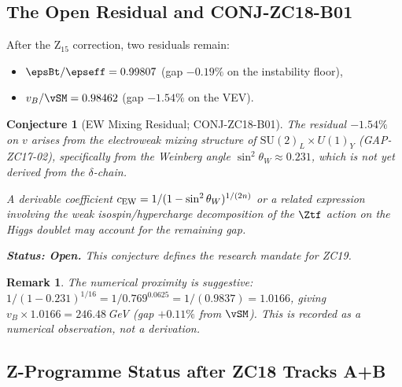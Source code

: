 \documentclass[12pt, a4paper]{article}
\newtheorem{remark}{Remark}[section]
\newtheorem{conjecture}{Conjecture}[section]
\begin{document}
\subsection{The Open Residual and CONJ-ZC18-B01}
\label{zc18b:sec:residual}

After the Z$_{15}$ correction, two residuals remain:
\begin{itemize}[leftmargin=*, noitemsep]
  \item $\epsBt/\epseff = 0.99807$ (gap $-0.19\%$ on the instability floor),
  \item $v_B/\vSM = 0.98462$ (gap $-1.54\%$ on the VEV).
\end{itemize}

\begin{conjecture}[EW Mixing Residual; CONJ-ZC18-B01]
\label{zc18b:conj:ew}
The residual $-1.54\%$ on $v$ arises from the electroweak mixing
structure of $\mathrm{SU}(2)_L\times U(1)_Y$ (GAP-ZC17-02),
specifically from the Weinberg angle $\sin^2\theta_W\approx 0.231$,
which is not yet derived from the $\delta$-chain.

A derivable coefficient
$c_{\rm EW} = 1/(1-\sin^2\theta_W)^{1/(2n)}$ or a related expression
involving the weak isospin/hypercharge decomposition of the
$\Ztf$ action on the Higgs doublet
may account for the remaining gap.

\textbf{Status: Open.} This conjecture defines the research mandate
for ZC19.
\end{conjecture}

\begin{remark}
The numerical proximity is suggestive:
$1/(1-0.231)^{1/16} = 1/0.769^{0.0625} = 1/(0.9837) = 1.0166$,
giving $v_B\times 1.0166 = 246.48$\,GeV (gap $+0.11\%$ from $\vSM$).
This is recorded as a numerical observation, not a derivation.
\end{remark}

\subsection{Z-Programme Status after ZC18 Tracks A+B}
\label{zc18b:sec:status}
\end{document}
